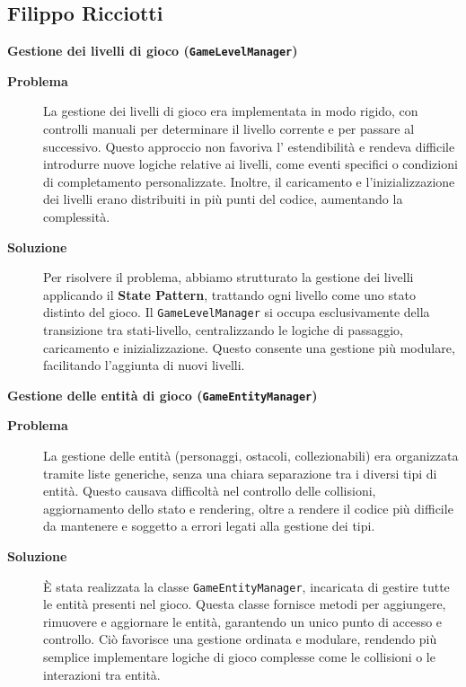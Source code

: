 \documentclass[a4paper,12pt]{report}
\begin{document}
\subsection{Filippo Ricciotti}

\noindent
\textbf{Gestione dei livelli di gioco (\texttt{GameLevelManager})}
\begin{description}
	\item[\textbf{Problema}]
	      La gestione dei livelli di gioco era implementata in modo rigido, con controlli manuali per determinare il livello corrente e per passare al successivo. Questo approccio non favoriva l'
	      estendibilità e rendeva difficile introdurre nuove logiche relative ai livelli, come eventi specifici o condizioni di completamento personalizzate. Inoltre, il caricamento e l'inizializzazione dei
	      livelli erano distribuiti in più punti del codice, aumentando la complessità.

	\item[\textbf{Soluzione}]
	      Per risolvere il problema, abbiamo strutturato la gestione dei livelli applicando il \textbf{State Pattern}, trattando ogni livello come uno stato distinto del gioco. Il \texttt{GameLevelManager}
	      si occupa esclusivamente della transizione tra stati-livello, centralizzando le logiche di passaggio, caricamento e inizializzazione. Questo consente una gestione più modulare, facilitando
	      l'aggiunta di nuovi livelli.
\end{description}

\noindent
\textbf{Gestione delle entità di gioco (\texttt{GameEntityManager})}
\begin{description}
	\item[\textbf{Problema}]
	      La gestione delle entità (personaggi, ostacoli, collezionabili) era organizzata tramite liste generiche, senza una chiara separazione tra i diversi tipi di entità. Questo causava
	      difficoltà nel controllo delle collisioni, aggiornamento dello stato e rendering, oltre a rendere il codice più difficile da mantenere e soggetto a errori legati alla gestione dei tipi.

	\item[\textbf{Soluzione}]
	      È stata realizzata la classe \texttt{GameEntityManager}, incaricata di gestire tutte le entità presenti nel gioco. Questa classe fornisce metodi per aggiungere, rimuovere e aggiornare le
	      entità, garantendo un unico punto di accesso e controllo. Ciò favorisce una gestione ordinata e modulare, rendendo più semplice implementare logiche di gioco complesse come le collisioni o
	      le interazioni tra entità.
\end{description}
\end{document}
